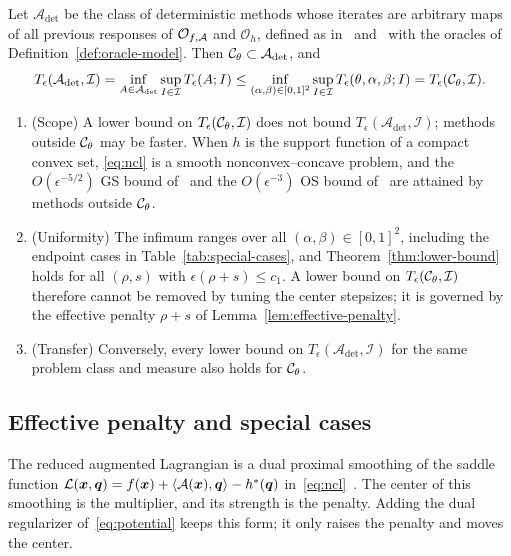 \begin{remark}
\label{rem:family-not-oracle}
Let \(\mathcal A_{\det}\) be the class of deterministic methods whose iterates
are arbitrary maps of all previous responses of \(\mathcal O_{f,\mathcal{A}}\) and
\(\mathcal O_h\), defined as in~\cite[Section~2.2]{carmon2020lower}
and~\cite[Definition~2.5]{pan2026optimal} with the oracles of
Definition~\ref{def:oracle-model}. Then \(\mathcal{C}_\theta\subset\mathcal A_{\det}\), and
\[
    T_\epsilon(\mathcal A_{\det},\mathcal I)
    =\inf_{A\in\mathcal A_{\det}}\sup_{I\in\mathcal I}T_\epsilon(A;I)
    \le\inf_{(\alpha,\beta)\in[0,1]^2}\sup_{I\in\mathcal I}
    T_\epsilon(\theta,\alpha,\beta;I)
    =T_\epsilon(\mathcal{C}_\theta,\mathcal I).
\]
\begin{enumerate}[label=(\roman*)]
\item (Scope) A lower bound on \(T_\epsilon(\mathcal{C}_\theta,\mathcal I)\) does not
  bound \(T_\epsilon(\mathcal A_{\det},\mathcal I)\); methods outside
  \(\mathcal{C}_\theta\) may be faster. When \(h\) is the support function of a
  compact convex set, \eqref{eq:ncl} is a smooth nonconvex--concave problem,
  and the \(O(\epsilon^{-5/2})\) GS bound of~\cite{zhang2026matching} and the
  \(O(\epsilon^{-3})\) OS bound of~\cite{pan2026optimal} are attained by
  methods outside \(\mathcal{C}_\theta\).
\item (Uniformity) The infimum ranges over all \((\alpha,\beta)\in[0,1]^2\),
  including the endpoint cases in Table~\ref{tab:special-cases}, and
  Theorem~\ref{thm:lower-bound} holds for all \((\rho,s)\) with
  \(\epsilon(\rho+s)\le c_1\). A lower bound on
  \(T_\epsilon(\mathcal{C}_\theta,\mathcal I)\) therefore cannot be removed by
  tuning the center stepsizes; it is governed by the effective penalty
  \(\rho+s\) of Lemma~\ref{lem:effective-penalty}.
\item (Transfer) Conversely, every lower bound on
  \(T_\epsilon(\mathcal A_{\det},\mathcal I)\) for the same problem class and
  measure also holds for \(\mathcal{C}_\theta\).
\end{enumerate}
\end{remark}

\subsection{Effective penalty and special cases}
\label{subsec:effective-penalty}

The reduced augmented Lagrangian is a dual proximal smoothing of the saddle
function \(\mathcal{L}(\bm{x},\bm{q})=f(\bm{x})+\langle\mathcal{A}(\bm{x}),\bm{q}\rangle-h^*(\bm{q})\)
in~\eqref{eq:ncl}~\cite{rockafellar1976augmented}. The center of this
smoothing is the multiplier, and its strength is the penalty. Adding the dual
regularizer of~\eqref{eq:potential} keeps this form; it only raises the
penalty and moves the center.

